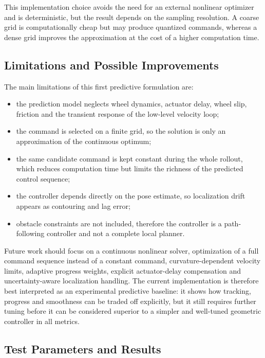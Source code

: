 This implementation choice avoids the need for an external nonlinear optimizer
and is deterministic, but the result depends on the sampling resolution.  A
coarse grid is computationally cheap but may produce quantized commands, whereas
a dense grid improves the approximation at the cost of a higher computation
time.

\subsection{Limitations and Possible Improvements}

The main limitations of this first predictive formulation are:
\begin{itemize}
    \item the prediction model neglects wheel dynamics, actuator delay, wheel
    slip, friction and the transient response of the low-level velocity loop;
    \item the command is selected on a finite grid, so the solution is only an
    approximation of the continuous optimum;
    \item the same candidate command is kept constant during the whole rollout,
    which reduces computation time but limits the richness of the predicted
    control sequence;
    \item the controller depends directly on the pose estimate, so localization
    drift appears as contouring and lag error;
    \item obstacle constraints are not included, therefore the controller is a
    path-following controller and not a complete local planner.
\end{itemize}

Future work should focus on a continuous nonlinear solver, optimization of a full
command sequence instead of a constant command, curvature-dependent velocity
limits, adaptive progress weights, explicit actuator-delay compensation and
uncertainty-aware localization handling.  The current implementation is
therefore best interpreted as an experimental predictive baseline: it shows how
tracking, progress and smoothness can be traded off explicitly, but it still
requires further tuning before it can be considered superior to a simpler and
well-tuned geometric controller in all metrics.

\subsection{Test Parameters and Results}

